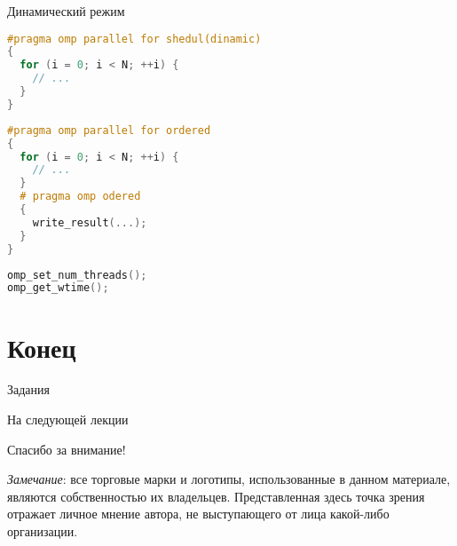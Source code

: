 \begin{frame}[fragile]{Динамический режим}

\begin{lstlisting}[language=C++,basicstyle=\ttfamily,keywordstyle=\color{blue},basicstyle=\scriptsize]
#pragma omp parallel for shedul(dinamic)
{
  for (i = 0; i < N; ++i) {
    // ...
  }
}
\end{lstlisting}

\end{frame}

\begin{frame}[fragile]

\begin{lstlisting}[language=C++,basicstyle=\ttfamily,keywordstyle=\color{blue},basicstyle=\scriptsize]
#pragma omp parallel for ordered
{
  for (i = 0; i < N; ++i) {
    // ...
  }
  # pragma omp odered
  {
    write_result(...);
  }
}
\end{lstlisting}

\end{frame}

\begin{frame}[fragile]

\begin{lstlisting}[language=C++,basicstyle=\ttfamily,keywordstyle=\color{blue},basicstyle=\scriptsize]
omp_set_num_threads();
omp_get_wtime();
\end{lstlisting}

\end{frame}

\section*{Конец}

\begin{frame}{Задания}
\end{frame}

\begin{frame}{На следующей лекции}
\end{frame}

\begin{frame}

{\huge{Спасибо за внимание!}\par}

\vfill

\tiny{\textit{Замечание}: все торговые марки и логотипы, использованные в данном материале, являются собственностью их владельцев. Представленная здесь точка зрения отражает личное мнение автора, не выступающего от лица какой-либо организации.}

\end{frame}


